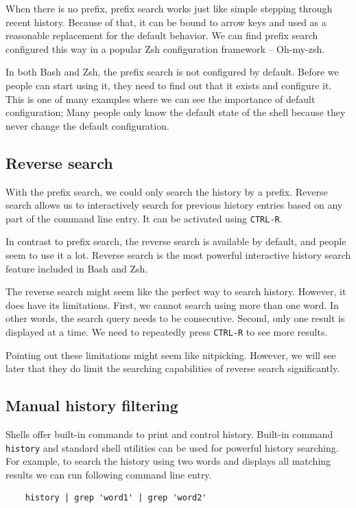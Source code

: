 When there is no prefix, prefix search works just like simple stepping through recent history. Because of that, it can be bound to arrow keys and used as a reasonable replacement for the default behavior. We can find prefix search configured this way in a popular Zsh configuration framework -- Oh-my-zsh\cite{toolsohmyzsh}.

In both Bash and Zsh, the prefix search is not configured by default. Before we people can start using it, they need to find out that it exists and configure it. This is one of many examples where we can see the importance of default configuration; Many people only know the default state of the shell because they never change the default configuration.

\subsection{Reverse search}

With the prefix search, we could only search the history by a prefix.
Reverse search allows us to interactively search for previous history entries based on any part of the command line entry. It can be activated using \verb|CTRL-R|.

In contrast to prefix search, the reverse search is available by default, and people seem to use it a lot. Reverse search is the most powerful interactive history search feature included in Bash and Zsh.

The reverse search might seem like the perfect way to search history. However, it does have its limitations. First, we cannot search using more than one word. In other words, the search query needs to be consecutive. Second, only one result is displayed at a time. We need to repeatedly press \verb|CTRL-R| to see more results.

Pointing out these limitations might seem like nitpicking. However, we will see later that they do limit the searching capabilities of reverse search significantly.


\subsection{Manual history filtering}

Shells offer built-in commands to print and control history. Built-in command \verb|history| and standard shell utilities can be used for powerful history searching.
For example, to search the history using two words and displays all matching results we can run following command line entry. 
\begin{verbatim}
    history | grep 'word1' | grep 'word2'
\end{verbatim}

